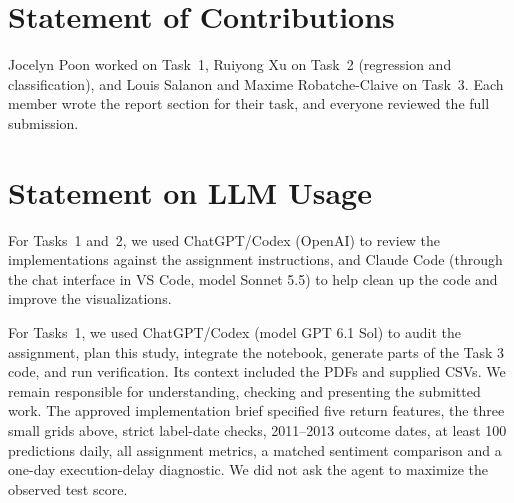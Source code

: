 \documentclass[conference]{IEEEtran}
\begin{document}
\section{Statement of Contributions}
Jocelyn Poon worked on Task~1, Ruiyong Xu on Task~2 (regression and classification), and Louis Salanon and Maxime Robatche-Claive on Task~3. Each member wrote the report section for their task, and everyone reviewed the full submission.


\section{Statement on LLM Usage}
\label{sec:llm}

For Tasks~1 and~2, we used ChatGPT/Codex (OpenAI) to review the implementations against the assignment instructions, and Claude Code (through the chat interface in VS Code, model Sonnet 5.5) to help clean up the code and improve the visualizations.

For Tasks~1, we used ChatGPT/Codex (model GPT 6.1 Sol) to audit the assignment, plan this study, integrate the notebook, generate parts of the Task 3 code, and run verification. Its context included the PDFs and supplied CSVs. We remain responsible for understanding, checking and presenting the submitted work. The approved implementation brief specified five return features, the three small grids above,
strict label-date checks, 2011–2013 outcome dates, at least 100 predictions daily, all assignment
metrics, a matched sentiment comparison and a one-day execution-delay diagnostic. We did not ask
the agent to maximize the observed test score.
\end{document}

